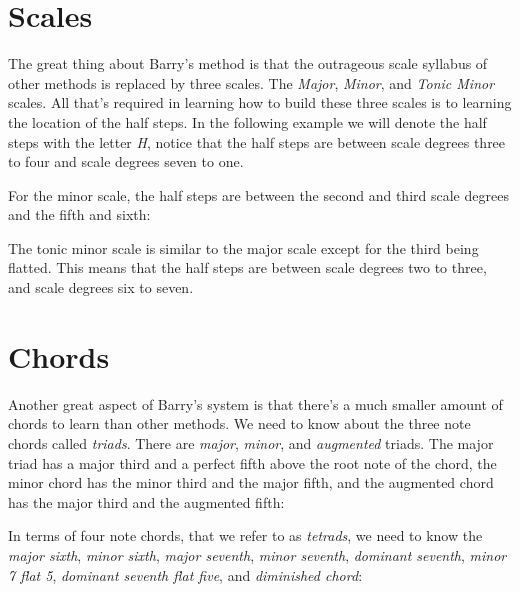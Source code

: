 \section{Scales}

The great thing about Barry's method is that the outrageous scale syllabus of other methods is replaced by three scales. The \emph{Major}, \emph{Minor}, and \emph{Tonic Minor} scales. All that's required in learning how to build these three scales is to learning the location of the half steps. In the following example we will denote the half steps with the letter \emph{H}, notice that the half steps are between scale degrees three to four and scale degrees seven to one.


For the minor scale, the half steps are between the second and third scale degrees and the fifth and sixth:


The tonic minor scale is similar to the major scale except for the third being flatted. This means that the half steps are between scale degrees two to three, and scale degrees six to seven.


\section{Chords}

Another great aspect of Barry's system is that there's a much smaller amount of chords to learn than other methods. We need to know about the three note chords called \emph{triads}. There are \emph{major}, \emph{minor}, and \emph{augmented} triads. The major triad has a major third and a perfect fifth above the root note of the chord, the minor chord has the minor third and the major fifth, and the augmented chord has the major third and the augmented fifth:


In terms of four note chords, that we refer to as \emph{tetrads}, we need to know the \emph{major sixth}, \emph{minor sixth}, \emph{major seventh}, \emph{minor seventh}, \emph{dominant seventh}, \emph{minor 7 flat 5}, \emph{dominant seventh flat five}, and \emph{diminished chord}:


